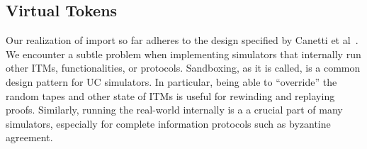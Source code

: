 %
%
%
%
%

\subsection{Virtual Tokens}
Our realization of import so far adheres to the design specified by Canetti et al~\cite{canettiUC}.
We encounter a subtle problem when implementing simulators that internally run other ITMs, functionalities, or protocols.
Sandboxing, as it is called, is a common design pattern for UC simulators. 
In particular, being able to ``override'' the random tapes and other state of ITMs is useful for rewinding and replaying proofs.
Similarly, running the real-world internally is a a crucial part of many simulators, especially for complete information protocols such as byzantine agreement.

